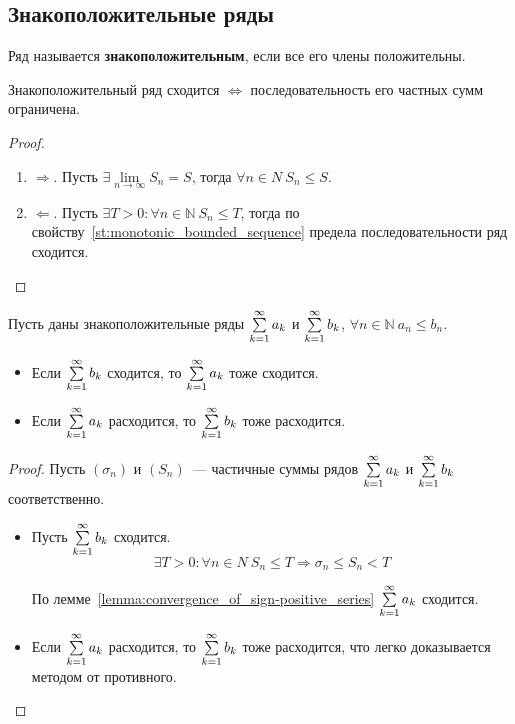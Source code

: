 \subsection{Знакоположительные ряды}
 Ряд называется \textbf{знакоположительным}, если все его члены положительны.

\begin{lemma}
\label{lemma:convergence_of_sign-positive_series}
Знакоположительный ряд сходится $\Leftrightarrow$ последовательность его частных сумм ограничена.
\end{lemma}
\begin{proof}
\begin{enumerate}
	\item $\Rightarrow$. Пусть $\exists \lim\limits_{n \to \infty} S_n = S$, тогда $\forall n \in N \ S_n \leqslant S$.
	\item $\Leftarrow$. Пусть $\exists T > 0 \colon \forall n \in \mathbb N \ S_n \leqslant T$, тогда по свойству~\ref{st:monotonic_bounded_sequence} предела последовательности ряд сходится.
\end{enumerate}
\end{proof}

\begin{theorem}[сравнения]
\label{th:direct_comparison_test1}
Пусть даны знакоположительные ряды $\sum\limits_{k=1}^\infty a_k$ и $\sum\limits_{k=1}^\infty b_k$, $\forall n \in \mathbb N \ a_n \leqslant b_n$.
\begin{itemize}
	\item Если $\sum\limits_{k=1}^\infty b_k$ сходится, то $\sum\limits_{k=1}^\infty a_k$ тоже сходится.
	\item Если $\sum\limits_{k=1}^\infty a_k$ расходится, то $\sum\limits_{k=1}^\infty b_k$ тоже расходится.
\end{itemize}
\end{theorem}
\begin{proof}
Пусть $(\sigma_n)$ и $(S_n)$~--- частичные суммы рядов $\sum\limits_{k=1}^\infty a_k$ и $\sum\limits_{k=1}^\infty b_k$ соответственно.
\begin{itemize}
	\item Пусть $\sum\limits_{k=1}^\infty b_k$ сходится.
	\begin{equation*}
	\exists T > 0 \colon \forall n \in N \ S_n \leqslant T \Rightarrow
	\sigma_n \leqslant S_n < T
	\end{equation*}
	
	По лемме~\ref*{lemma:convergence_of_sign-positive_series} $\sum\limits_{k=1}^\infty a_k$ сходится.
	
	\item Если $\sum\limits_{k=1}^\infty a_k$ расходится, то $\sum\limits_{k=1}^\infty b_k$ тоже расходится, что легко доказывается методом от противного.
\end{itemize}
\end{proof}

